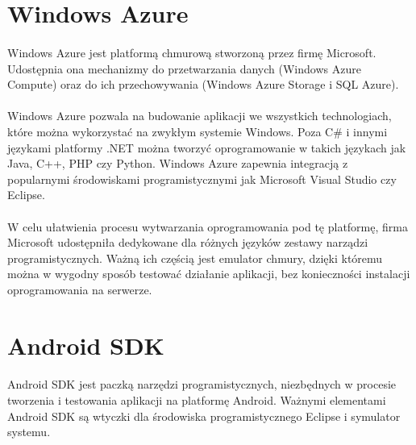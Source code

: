 \section{Windows Azure} %

\paragraph{} %
Windows Azure jest platformą chmurową stworzoną przez firmę Microsoft. Udostępnia ona mechanizmy do przetwarzania danych (Windows Azure Compute) oraz do ich przechowywania (Windows Azure Storage  i SQL Azure).
\paragraph{} %
\label{par:}

Windows Azure pozwala na budowanie aplikacji we wszystkich technologiach, które można wykorzystać na zwykłym systemie Windows. Poza C\# i innymi językami platformy .NET można tworzyć oprogramowanie w takich językach jak Java, C++, PHP czy Python. Windows Azure zapewnia integracją z popularnymi środowiskami programistycznymi jak Microsoft Visual Studio czy Eclipse.
\paragraph{} %
\label{par:}

W celu ułatwienia procesu wytwarzania oprogramowania pod tę platformę, firma Microsoft udostępniła dedykowane dla różnych języków zestawy narządzi programistycznych. Ważną ich częścią jest emulator chmury, dzięki któremu można w wygodny sposób testować działanie aplikacji, bez konieczności instalacji oprogramowania na serwerze.

\section{Android SDK} %
\label{sec:android_sdk}

\paragraph{} %
\label{par:}

Android SDK jest paczką narzędzi programistycznych, niezbędnych w procesie tworzenia i testowania aplikacji na platformę Android. Ważnymi elementami Android SDK są wtyczki dla środowiska programistycznego Eclipse i symulator systemu.

